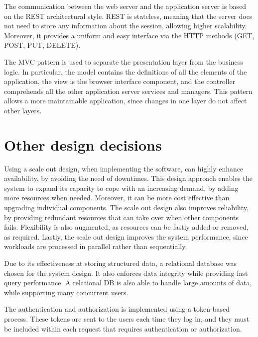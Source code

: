The communication between the web server and the application server is based on the REST architectural style.
REST is stateless, meaning that the server does not need to store any information about the session, allowing higher scalability.
Moreover, it provides a uniform and easy interface via the HTTP methods (GET, POST, PUT, DELETE).

The MVC pattern is used to separate the presentation layer from the business logic.
In particular, the model contains the definitions of all the elements of the application, the view is the browser interface component, and the controller comprehends all the other application server services and managers.
This pattern allows a more maintainable application, since changes in one layer do not affect other layers.

\section{Other design decisions}

Using a scale out design, when implementing the software, can highly enhance availability, by avoiding the need of downtimes.
This design approach enables the system to expand its capacity to cope with an increasing demand, by adding more resources when needed.
Moreover, it can be more cost effective than upgrading individual components.
The scale out design also improves reliability, by providing redundant resources that can take over when other components fails.
Flexibility is also augmented, as resources can be fastly added or removed, as required.
Lastly, the scale out design improves the system performance, since workloads are processed in parallel rather than sequentially.

Due to its effectiveness at storing structured data, a relational database was chosen for the system design.
It also enforces data integrity while providing fast query performance.
A relational DB is also able to handle large amounts of data, while supporting many concurrent users.

The authentication and authorization is implemented using a token-based process.
These tokens are sent to the users each time they log in, and they must be included within each request that requires authentication or authorization.

